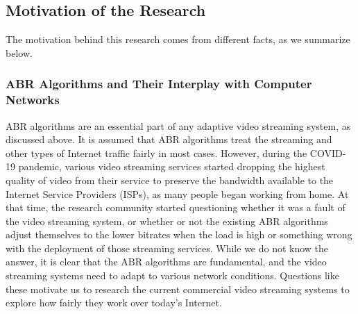 
\subsection{Motivation of the Research}
The motivation behind this research comes from different facts, as we summarize below. 

\subsubsection{ABR Algorithms and Their Interplay with Computer Networks}
ABR algorithms are an essential part of any adaptive video streaming system, as discussed above. It is assumed that ABR algorithms treat the streaming and other types of Internet traffic fairly in most cases. However, during the COVID-19 pandemic, various video streaming services started dropping the highest quality of video from their service to preserve the bandwidth available to the Internet Service Providers (ISPs), as many people began working from home. At that time, the research community started questioning whether it was a fault of the video streaming system, or whether or not the existing ABR algorithms adjust themselves to the lower bitrates when the load is high or something wrong with the deployment of those streaming services. While we do not know the answer, it is clear that the ABR algorithms are fundamental, and the video streaming systems need to adapt to various network conditions. Questions like these motivate us to research the current commercial video streaming systems to explore how fairly they work over today's Internet.

